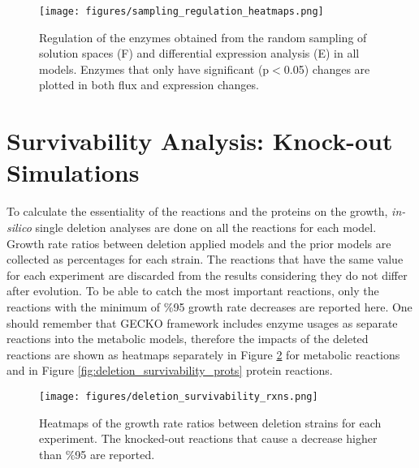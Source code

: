 \begin{figure}[H]
  \begin{center}
  \texttt{[image: figures/sampling\_regulation\_heatmaps.png]}
  \caption[Regulation of the enzymes obtained from the random sampling of solution spaces (F) and differential expression analysis (E) in all models. Enzymes that only have significant (p$<$0.05) changes are plotted in both flux and expression changes]{Regulation of the enzymes obtained from the random sampling of solution spaces (F) and differential expression analysis (E) in all models. Enzymes that only have significant (p$<$0.05) changes are plotted in both flux and expression changes. }
  \label{fig:sampling_regulation_heatmaps}
  \end{center}
\end{figure}


\section{Survivability Analysis: Knock-out Simulations}
To calculate the essentiality of the reactions and the proteins on the growth, \emph{in-silico} single deletion analyses are done on all the reactions for each model. Growth rate ratios between deletion applied models and the prior models are collected as percentages for each strain. The reactions that have the same value for each experiment are discarded from the results considering they do not differ after evolution. To be able to catch the most important reactions, only the reactions with the minimum of \%95 growth rate decreases are reported here. One should remember that GECKO framework includes enzyme usages as separate reactions into the metabolic models, therefore the impacts of the deleted reactions are shown as heatmaps separately in Figure \ref{fig:deletion_survivability_rxns} for metabolic reactions and in Figure \ref{fig:deletion_survivability_prots} protein reactions.

\begin{figure}[H]
  \begin{center}
  \texttt{[image: figures/deletion\_survivability\_rxns.png]}
  \caption[Heatmaps of the growth rate ratios between deletion strains for each experiment. The knocked-out reactions that cause a decrease higher than \%95 are reported.]{Heatmaps of the growth rate ratios between deletion strains for each experiment. The knocked-out reactions that cause a decrease higher than \%95 are reported.}
  \label{fig:deletion_survivability_rxns}
  \end{center}
\end{figure}

